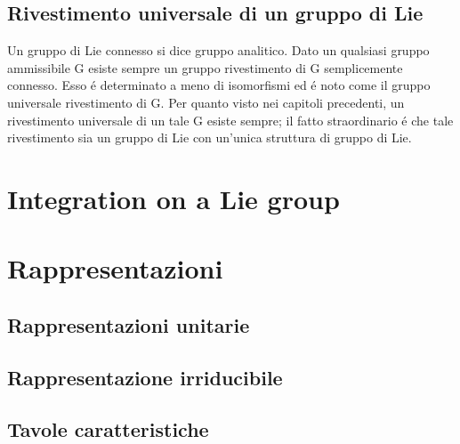 \documentclass[oneside,12pt]{memoir}
\begin{document}
\subsection{Rivestimento universale di un gruppo di Lie}
Un gruppo di Lie connesso si dice gruppo analitico.
Dato un qualsiasi gruppo ammissibile G esiste sempre un gruppo rivestimento di G semplicemente connesso. Esso \'e determinato a meno di isomorfismi ed \'e noto come il gruppo universale rivestimento di G. Per quanto visto nei capitoli precedenti, un rivestimento universale di un tale G esiste sempre; il fatto straordinario \'e che tale rivestimento sia un gruppo di Lie con un’unica struttura di gruppo di Lie.



\section{Integration on a Lie group}

\section{Rappresentazioni}

\subsection{Rappresentazioni unitarie}

\subsection{Rappresentazione irriducibile}



\subsection{Tavole caratteristiche}

\end{document}
